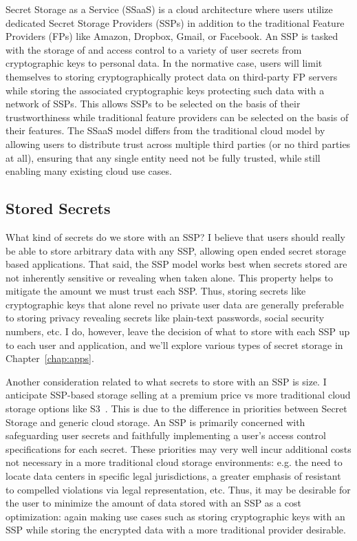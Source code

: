 Secret Storage as a Service (SSaaS) is a cloud architecture where
users utilize dedicated Secret Storage Providers (SSPs) in addition to
the traditional Feature Providers (FPs) like Amazon, Dropbox, Gmail,
or Facebook. An SSP is tasked with the storage of and access control
to a variety of user secrets from cryptographic keys to personal
data. In the normative case, users will limit themselves to storing
cryptographically protect data on third-party FP servers while storing
the associated cryptographic keys protecting such data with a network
of SSPs. This allows SSPs to be selected on the basis of their
trustworthiness while traditional feature providers can be selected on
the basis of their features. The SSaaS model differs from the
traditional cloud model by allowing users to distribute trust across
multiple third parties (or no third parties at all), ensuring that any
single entity need not be fully trusted, while still enabling many
existing cloud use cases.

\subsection{Stored Secrets}

What kind of secrets do we store with an SSP? I believe that users
should really be able to store arbitrary data with any SSP, allowing
open ended secret storage based applications. That said, the SSP model
works best when secrets stored are not inherently sensitive or
revealing when taken alone. This property helps to mitigate the amount
we must trust each SSP. Thus, storing secrets like cryptographic keys
that alone revel no private user data are generally preferable to
storing privacy revealing secrets like plain-text passwords, social
security numbers, etc. I do, however, leave the decision of what to
store with each SSP up to each user and application, and we'll explore
various types of secret storage in Chapter~\ref{chap:apps}.

Another consideration related to what secrets to store with an SSP is
size. I anticipate SSP-based storage selling at a premium price vs
more traditional cloud storage options like S3~\cite{amazon-s3}. This
is due to the difference in priorities between Secret Storage and
generic cloud storage. An SSP is primarily concerned with safeguarding
user secrets and faithfully implementing a user's access control
specifications for each secret. These priorities may very well incur
additional costs not necessary in a more traditional cloud storage
environments: e.g. the need to locate data centers in specific legal
jurisdictions, a greater emphasis of resistant to compelled violations
via legal representation, etc. Thus, it may be desirable for the user
to minimize the amount of data stored with an SSP as a cost
optimization: again making use cases such as storing cryptographic
keys with an SSP while storing the encrypted data with a more
traditional provider desirable.

